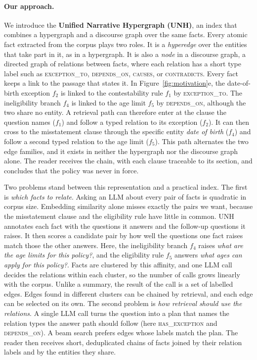 \documentclass[sigconf, review, anonymous]{acmart}
\newcommand{\sys}{UNH}
\newcommand{\sysfull}{Unified Narrative Hypergraph}
\newcommand{\rel}[1]{\textsc{#1}}            %
\begin{document}
\paragraph{Our approach.}
We introduce the \textbf{\sysfull{} (\sys{})}, an index that combines a hypergraph and a discourse graph over the same facts. Every atomic fact extracted from the corpus plays two roles. It is a \emph{hyperedge} over the entities that take part in it, as in a hypergraph. It is also a \emph{node} in a discourse graph, a directed graph of relations between facts, where each relation has a short type label such as \rel{exception\_to}, \rel{depends\_on}, \rel{causes}, or \rel{contradicts}. Every fact keeps a link to the passage that states it. In Figure~\ref{fig:motivation}e, the date-of-birth exception $f_2$ is linked to the contestability rule $f_1$ by \rel{exception\_to}. The ineligibility branch $f_4$ is linked to the age limit $f_5$ by \rel{depends\_on}, although the two share no entity. A retrieval path can therefore enter at the clause the question names ($f_1$) and follow a typed relation to its exception ($f_2$). It can then cross to the misstatement clause through the specific entity \emph{date of birth} ($f_4$) and follow a second typed relation to the age limit ($f_5$). This path alternates the two edge families, and it exists in neither the hypergraph nor the discourse graph alone. The reader receives the chain, with each clause traceable to its section, and concludes that the policy was never in force.

Two problems stand between this representation and a practical index. The first is \emph{which facts to relate}. Asking an LLM about every pair of facts is quadratic in corpus size. Embedding similarity alone misses exactly the pairs we want, because the misstatement clause and the eligibility rule have little in common. \sys{} annotates each fact with the questions it answers and the follow-up questions it raises. It then scores a candidate pair by how well the questions one fact raises match those the other answers. Here, the ineligibility branch $f_4$ raises \emph{what are the age limits for this policy?}, and the eligibility rule $f_5$ answers \emph{what ages can apply for this policy?}. Facts are clustered by this affinity, and one LLM call decides the relations within each cluster, so the number of calls grows linearly with the corpus. Unlike a summary, the result of the call is a set of labelled edges. Edges found in different clusters can be chained by retrieval, and each edge can be selected on its own. The second problem is \emph{how retrieval should use the relations}. A single LLM call turns the question into a plan that names the relation types the answer path should follow (here \rel{has\_exception} and \rel{depends\_on}). A beam search prefers edges whose labels match the plan. The reader then receives short, deduplicated chains of facts joined by their relation labels and by the entities they share.
\end{document}
